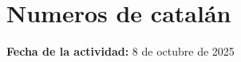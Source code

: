 \documentclass[../portafolio.tex]{subfiles}
\begin{document}
\chapter{Numeros de catalán}
\hfill \textbf{Fecha de la actividad:} 8 de octubre de 2025
\end{document}
